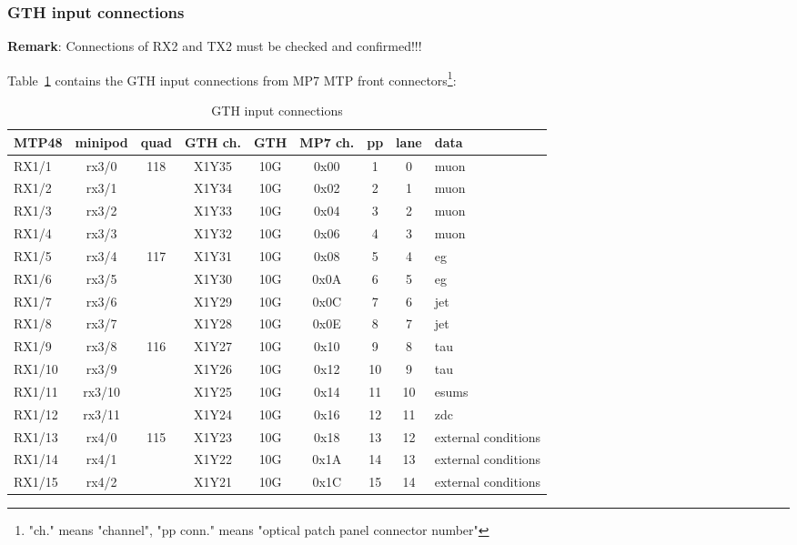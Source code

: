 \clearpage

\subsubsection{GTH input connections}\label{sec:app:gth_i_conn}

\textbf{Remark}:
Connections of RX2 and TX2 must be checked and confirmed!!!

Table~\ref{tab:app:gth_i_conn} contains the GTH input connections from MP7 MTP front connectors\footnote{"ch." means "channel", "pp conn." means "optical patch panel connector number"}:

\begin{longtable}{|l|c|c|c|c|c|c|c|l|}
\caption{GTH input connections}
    \label{tab:app:gth_i_conn}\\
\hline
\textbf{MTP48}& \textbf{minipod}& \textbf{quad}& \textbf{GTH ch.}& \textbf{GTH}& \textbf{MP7 ch.} &\textbf{pp}& \textbf{lane}& \textbf{data}\\
\hline
\hline
\endhead
RX1/1  & rx3/0  & 118 & X1Y35 & 10G & 0x00 & 1  & 0  & muon\\\hline
RX1/2  & rx3/1  &     & X1Y34 & 10G & 0x02 & 2  & 1  & muon\\\hline
RX1/3  & rx3/2  &     & X1Y33 & 10G & 0x04 & 3  & 2  & muon\\\hline
RX1/4  & rx3/3  &     & X1Y32 & 10G & 0x06 & 4  & 3  & muon\\\hline
RX1/5  & rx3/4  & 117 & X1Y31 & 10G & 0x08 & 5  & 4  & eg\\\hline
RX1/6  & rx3/5  &     & X1Y30 & 10G & 0x0A & 6  & 5  & eg\\\hline
RX1/7  & rx3/6  &     & X1Y29 & 10G & 0x0C & 7  & 6  & jet\\\hline
RX1/8  & rx3/7  &     & X1Y28 & 10G & 0x0E & 8  & 7  & jet\\\hline
RX1/9  & rx3/8  & 116 & X1Y27 & 10G & 0x10 & 9  & 8  & tau\\\hline
RX1/10 & rx3/9  &     & X1Y26 & 10G & 0x12 & 10 & 9  & tau\\\hline
RX1/11 & rx3/10 &     & X1Y25 & 10G & 0x14 & 11 & 10 & esums\\\hline
RX1/12 & rx3/11 &     & X1Y24 & 10G & 0x16 & 12 & 11 & zdc\\\hline
RX1/13 & rx4/0  & 115 & X1Y23 & 10G & 0x18 & 13 & 12 & external conditions\\\hline
RX1/14 & rx4/1  &     & X1Y22 & 10G & 0x1A & 14 & 13 & external conditions\\\hline
RX1/15 & rx4/2  &     & X1Y21 & 10G & 0x1C & 15 & 14 & external conditions\\\hline

\end{longtable}
